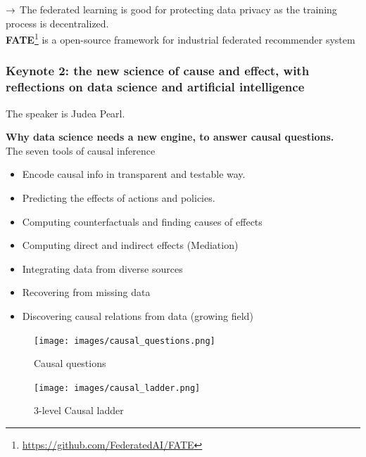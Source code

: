 

$\rightarrow$ The federated learning is good for protecting data privacy as the training process is decentralized.\\


{\bf FATE}\footnote{\url{https://github.com/FederatedAI/FATE}} is a open-source framework for industrial federated recommender system

\subsubsection{Keynote 2: the new science of cause and effect, with reflections on data science and artificial intelligence}

The speaker is Judea Pearl. 

{\bf Why data science needs a new engine, to answer causal questions.}\\

The seven tools of causal inference

\begin{itemize}
    \item Encode causal info in transparent and testable way.
    \item Predicting the effects of actions and policies.
    \item Computing counterfactuals and finding causes of effects
    \item Computing direct and indirect effects (Mediation)
    \item Integrating data from diverse sources
    \item Recovering from missing data
    \item Discovering causal relations from data (growing field)
\end{itemize}



\begin{figure}[htbp!]
    \centering
    \texttt{[image: images/causal\_questions.png]}
    \caption{Causal questions}
    \label{fig:causal_questions}
\end{figure}

\begin{figure}[htbp!]
    \centering
    \texttt{[image: images/causal\_ladder.png]}
    \caption{3-level Causal ladder}
    \label{fig:causal_laddar}
\end{figure}




\spacerule